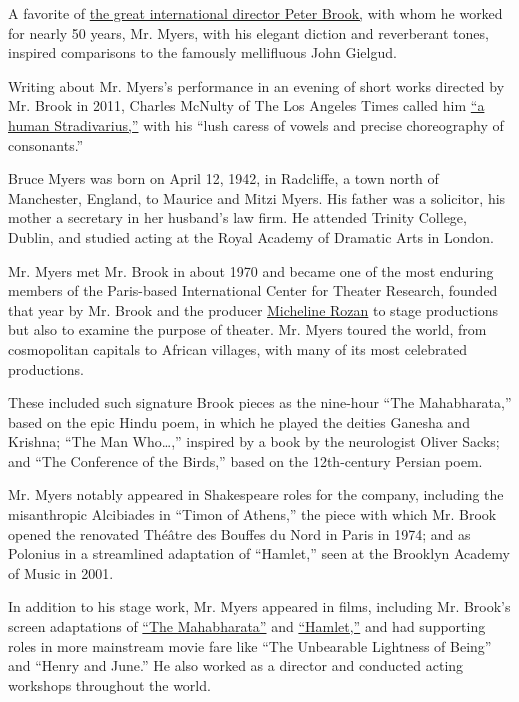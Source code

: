A favorite of
\href{https://www.nytimes3xbfgragh.onion/2019/09/18/theater/peter-brook-interview.html}{the
great international director Peter Brook,} with whom he worked for
nearly 50 years, Mr. Myers, with his elegant diction and reverberant
tones, inspired comparisons to the famously mellifluous John Gielgud.

Writing about Mr. Myers's performance in an evening of short works
directed by Mr. Brook in 2011, Charles McNulty of The Los Angeles Times
called him
\href{https://latimesblogs.latimes.com/culturemonster/2011/04/theater-review-an-evening-of-peter-brook-at-the-broad-stage.html}{``a
human Stradivarius,''} with his ``lush caress of vowels and precise
choreography of consonants.''

Bruce Myers was born on April 12, 1942, in Radcliffe, a town north of
Manchester, England, to Maurice and Mitzi Myers. His father was a
solicitor, his mother a secretary in her husband's law firm. He attended
Trinity College, Dublin, and studied acting at the Royal Academy of
Dramatic Arts in London.

Mr. Myers met Mr. Brook in about 1970 and became one of the most
enduring members of the Paris-based International Center for Theater
Research, founded that year by Mr. Brook and the producer
\href{https://www.nytimes3xbfgragh.onion/2018/09/19/obituaries/micheline-rozan-dead.html}{Micheline
Rozan} to stage productions but also to examine the purpose of theater.
Mr. Myers toured the world, from cosmopolitan capitals to African
villages, with many of its most celebrated productions.

These included such signature Brook pieces as the nine-hour ``The
Mahabharata,'' based on the epic Hindu poem, in which he played the
deities Ganesha and Krishna; ``The Man Who\ldots{},'' inspired by a book
by the neurologist Oliver Sacks; and ``The Conference of the Birds,''
based on the 12th-century Persian poem.

Mr. Myers notably appeared in Shakespeare roles for the company,
including the misanthropic Alcibiades in ``Timon of Athens,'' the piece
with which Mr. Brook opened the renovated Théâtre des Bouffes du Nord in
Paris in 1974; and as Polonius in a streamlined adaptation of
``Hamlet,'' seen at the Brooklyn Academy of Music in 2001.

In addition to his stage work, Mr. Myers appeared in films, including
Mr. Brook's screen adaptations of
\href{https://www.youtube.com/watch?v=-va1S1cT1s4}{``The Mahabharata''}
and \href{https://www.youtube.com/watch?v=XSfRZmNPHoE}{``Hamlet,''} and
had supporting roles in more mainstream movie fare like ``The Unbearable
Lightness of Being'' and ``Henry and June.'' He also worked as a
director and conducted acting workshops throughout the world.

